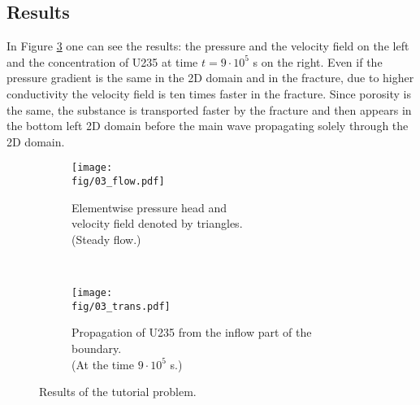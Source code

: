 \subsection{Results}
In Figure \ref{fig:tutorial} one can see the results: the pressure and the velocity field on the left and the 
concentration of U235 at time $t=9\cdot10^{5}$ s on the right. Even if the pressure gradient is the same in the 
2D domain and in the fracture, due to higher conductivity the velocity field is ten times faster in the fracture. 
Since porosity is the same, the substance is transported faster by the fracture and then appears in the bottom 
left 2D domain before the main wave propagating solely through the 2D domain.



\begin{figure}[ht]
    \centering
    \begin{subfigure}[b]{0.48\textwidth}
        \centering
        \texttt{[image: \\fig/03\_flow.pdf]}
        \caption{Elementwise pressure head and\\velocity field denoted by triangles.\\ (Steady flow.)}
        \label{fig:tut-flow}
    \end{subfigure}
    ~
    \begin{subfigure}[b]{0.48\textwidth}
        \centering
        \texttt{[image: \\fig/03\_trans.pdf]}
        \caption{Propagation of U235 from the inflow part of the boundary. \\ (At the time $9\cdot10^{5}$ s.)}
        \label{fig:tut-trans}
    \end{subfigure}
    \caption{Results of the tutorial problem.}
    \label{fig:tutorial}
\end{figure}
